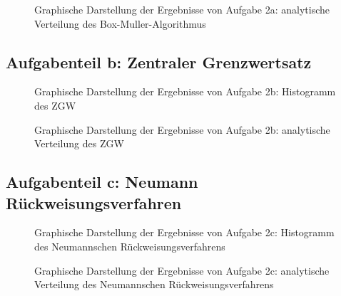 \begin{landscape}
	\begin{figure}
		\caption{Graphische Darstellung der Ergebnisse von Aufgabe 2a: analytische Verteilung des Box-Muller-Algorithmus}
		\label{fig:2a_v}
	\end{figure}
\end{landscape}

\subsection*{Aufgabenteil b: Zentraler Grenzwertsatz}

\begin{landscape}
	\begin{figure}
		\caption{Graphische Darstellung der Ergebnisse von Aufgabe 2b: Histogramm des ZGW}
		\label{fig:2b}
	\end{figure}
\end{landscape}

\begin{landscape}
	\begin{figure}
		\caption{Graphische Darstellung der Ergebnisse von Aufgabe 2b: analytische Verteilung des ZGW}
		\label{fig:2b_v}
	\end{figure}
\end{landscape}

\subsection*{Aufgabenteil c: Neumann Rückweisungsverfahren}

\begin{landscape}
	\begin{figure}
		\caption{Graphische Darstellung der Ergebnisse von Aufgabe 2c: Histogramm des Neumannschen Rückweisungsverfahrens}
		\label{fig:2c}
	\end{figure}
\end{landscape}

\begin{landscape}
	\begin{figure}
		\caption{Graphische Darstellung der Ergebnisse von Aufgabe 2c: analytische Verteilung des Neumannschen Rückweisungsverfahrens}
		\label{fig:2c_v}
	\end{figure}
\end{landscape}


